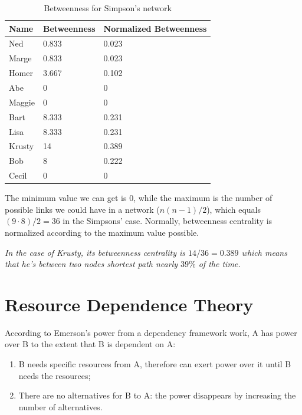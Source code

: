 \documentclass[
  notitlepage,
  onecolumn,
  openany]{book}
\providecommand{\tightlist}{%
  \setlength{\itemsep}{0pt}\setlength{\parskip}{0pt}}
\begin{document}
\begin{table}

\caption{\label{tab:unnamed-chunk-27}Betweenness for Simpson's network}
\centering
\begin{tabular}[t]{lll}
\toprule
Name & Betweenness & Normalized Betweenness\\
\midrule
Ned & 0.833 & 0.023\\
Marge & 0.833 & 0.023\\
Homer & 3.667 & 0.102\\
Abe & 0 & 0\\
Maggie & 0 & 0\\
\addlinespace
Bart & 8.333 & 0.231\\
Lisa & 8.333 & 0.231\\
Krusty & 14 & 0.389\\
Bob & 8 & 0.222\\
Cecil & 0 & 0\\
\bottomrule
\end{tabular}
\end{table}

The minimum value we can get is \(0\), while the maximum is the number of possible links we could have in a network (\(n(n-1)/2\)), which equals \((9\cdot 8)/2 = 36\) in the Simpsons' case. Normally, betweenness centrality is normalized according to the maximum value possible.

\emph{In the case of Krusty, its betweenness centrality is \(14/36 = 0.389\) which means that he's between two nodes shortest path nearly \(39\%\) of the time.}

\hypertarget{resource-dependence-theory}{%
\section{Resource Dependence Theory}\label{resource-dependence-theory}}

According to Emerson's power from a dependency framework work, A has power over B to the extent that B is dependent on A:

\begin{enumerate}
\def\labelenumi{\arabic{enumi}.}
\tightlist
\item
  B needs specific resources from A, therefore can exert power over it until B needs the resources;
\item
  There are no alternatives for B to A: the power disappears by increasing the number of alternatives.
\end{enumerate}
\end{document}
